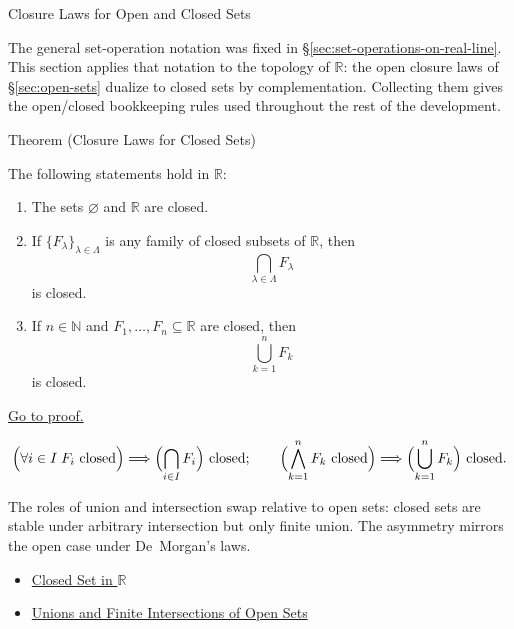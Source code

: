 \label{sec:unions-and-intersections}

\begin{topicbox}{Closure Laws for Open and Closed Sets}
\begin{exposition}
The general set-operation notation was fixed in
\S\ref{sec:set-operations-on-real-line}. This section applies that notation
to the topology of \(\mathbb R\): the open closure laws of
\S\ref{sec:open-sets} dualize to closed sets by complementation. Collecting
them gives the open/closed bookkeeping rules used throughout the rest of the
development.
\end{exposition}
\end{topicbox}
\begin{theorembox}{Theorem (Closure Laws for Closed Sets)}
\begin{theorem}
\label{thm:closed-set-closure-operations}
The following statements hold in $\mathbb{R}$:
\begin{enumerate}[label=(\roman*)]
  \item The sets $\varnothing$ and $\mathbb{R}$ are closed.
  \item If $\{F_\lambda\}_{\lambda\in\Lambda}$ is any family of closed subsets
  of $\mathbb{R}$, then
  \[
    \bigcap_{\lambda\in\Lambda}F_\lambda
  \]
  is closed.
  \item If $n\in\mathbb{N}$ and $F_1,\ldots,F_n\subseteq\mathbb{R}$ are
  closed, then
  \[
    \bigcup_{k=1}^{n}F_k
  \]
  is closed.
\end{enumerate}
\hyperref[prf:closed-set-closure-operations]{Go to proof.}
\end{theorem}
\end{theorembox}
\begin{remark*}
\[
\Bigl(\forall i\in I\;F_i\text{ closed}\Bigr)\Longrightarrow \Bigl(\bigcap_{i\in I} F_{i}\Bigr) \text{ closed};\qquad
\Bigl(\bigwedge_{k=1}^{n} F_k\text{ closed}\Bigr)\Longrightarrow \Bigl(\bigcup_{k=1}^{n} F_{k}\Bigr) \text{ closed}.
\]
\end{remark*}
\begin{remark*}[Interpretation]
The roles of union and intersection swap relative to open sets: closed sets are stable under arbitrary intersection but only finite union. The asymmetry mirrors the open case under De~Morgan's laws.
\end{remark*}
\begin{dependencies}
\begin{itemize}
  \item \hyperref[def:closed-set]{Closed Set in $\mathbb{R}$}
  \item \hyperref[thm:open-set-closure-operations]{Unions and Finite Intersections of Open Sets}
\end{itemize}
\end{dependencies}
